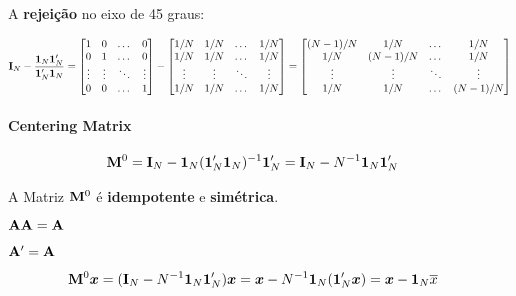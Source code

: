 \documentclass[11pt, oneside, a4paper, article]{article}
\numberwithin{equation}{section}
\begin{document}
\begin{description}
A \textbf{rejeição} no eixo de 45 graus:

\vspace{-1 em}
\begin{align*}
	\mathbf{I}_{N} - \frac{\boldsymbol{1}_{N} \boldsymbol{1}_{N}'}{\boldsymbol{1}_{N}' \boldsymbol{1}_{N}} 
	=
	\begin{bmatrix}
		1      & 0 &\dots  & 0	 \\
		0      & 1 &\dots  & 0	 \\
		\vdots & \vdots & \ddots & \vdots\\
		0      & 0 & \dots  & 1	
	\end{bmatrix}
	-
	\begin{bmatrix}
		1/N    & 1/N    & \dots  & 1/N	 \\
		1/N    & 1/N    & \dots  & 1/N	 \\
		\vdots & \vdots & \ddots & \vdots \\
		1/N    & 1/N    & \dots  & 1/N	
	\end{bmatrix}
	=
	\begin{bmatrix}
		(N-1)/N & 1/N     & \dots  & 1/N    \\
		1/N     & (N-1)/N & \dots  & 1/N    \\
		\vdots  & \vdots  & \ddots & \vdots \\
		1/N     & 1/N     & \dots  & (N-1)/N	
	\end{bmatrix}
\end{align*}

\paragraph{Centering Matrix} \cite[p. 978, A.28]{greene-7ed}

\vspace{-1 em}
\begin{align*}
	\mathbf{M}^{0} &= 
	\mathbf{I}_{N} - \boldsymbol{1}_{N} ( \boldsymbol{1}_{N}' \boldsymbol{1}_{N} )^{-1} \boldsymbol{1}_{N}'
	= 
	\mathbf{I}_{N} - N^{-1} \boldsymbol{1}_{N} \boldsymbol{1}_{N}' 
\end{align*}

A Matriz $\mathbf{M}^{0}$ é \textbf{idempotente} e \textbf{simétrica}.

\begin{description}[noitemsep]
	\item [Idempotência:] $\mathbf{A} \mathbf{A} = \mathbf{A}$
	\item [Simetria:] $\mathbf{A}'=\mathbf{A}$
\end{description}

\vspace{-2 em}
\begin{align*}
\mathbf{M}^{0} \boldsymbol{x} &= 
( \mathbf{I}_{N} - N^{-1} \boldsymbol{1}_{N} \boldsymbol{1}_{N}' ) \boldsymbol{x} 	= 
\boldsymbol{x} - N^{-1} \boldsymbol{1}_{N} (\boldsymbol{1}_{N}' \boldsymbol{x}) = 
\boldsymbol{x} - \boldsymbol{1}_{N} \overline{x}
\end{align*}


\end{description}
\end{document}
